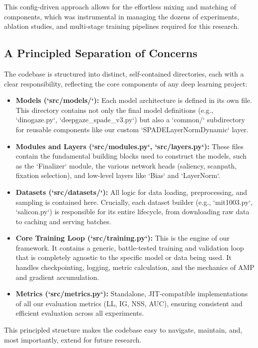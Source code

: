 This config-driven approach allows for the effortless mixing and matching of components, which was instrumental in managing the dozens of experiments, ablation studies, and multi-stage training pipelines required for this research.

\subsection{A Principled Separation of Concerns}
The codebase is structured into distinct, self-contained directories, each with a clear responsibility, reflecting the core components of any deep learning project:

\begin{itemize}
    \item \textbf{Models (`src/models/`):} Each model architecture is defined in its own file. This directory contains not only the final model definitions (e.g., `dinogaze.py`, `deepgaze\_spade\_v3.py`) but also a `common/` subdirectory for reusable components like our custom `SPADELayerNormDynamic` layer.
    \item \textbf{Modules and Layers (`src/modules.py`, `src/layers.py`):} These files contain the fundamental building blocks used to construct the models, such as the `Finalizer` module, the various network heads (saliency, scanpath, fixation selection), and low-level layers like `Bias` and `LayerNorm`.
    \item \textbf{Datasets (`src/datasets/`):} All logic for data loading, preprocessing, and sampling is contained here. Crucially, each dataset builder (e.g., `mit1003.py`, `salicon.py`) is responsible for its entire lifecycle, from downloading raw data to caching and serving batches.
    \item \textbf{Core Training Loop (`src/training.py`):} This is the engine of our framework. It contains a generic, battle-tested training and validation loop that is completely agnostic to the specific model or data being used. It handles checkpointing, logging, metric calculation, and the mechanics of AMP and gradient accumulation.
    \item \textbf{Metrics (`src/metrics.py`):} Standalone, JIT-compatible implementations of all our evaluation metrics (LL, IG, NSS, AUC), ensuring consistent and efficient evaluation across all experiments.
\end{itemize}

This principled structure makes the codebase easy to navigate, maintain, and, most importantly, extend for future research.




